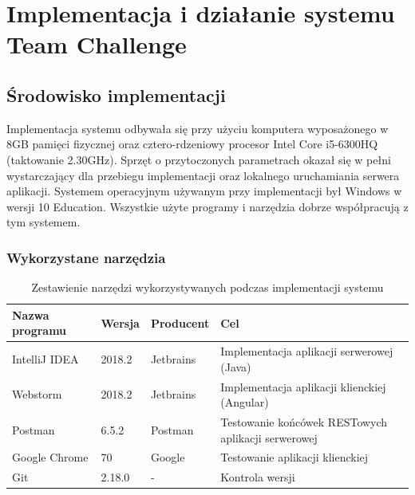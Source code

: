 \chapter{Implementacja i działanie systemu Team Challenge}

\section{Środowisko implementacji}

Implementacja systemu odbywała się przy użyciu komputera wyposażonego w 8GB pamięci fizycznej oraz cztero-rdzeniowy procesor Intel Core i5-6300HQ (taktowanie 2.30GHz). Sprzęt o przytoczonych parametrach okazał się w pełni wystarczający dla przebiegu implementacji oraz lokalnego uruchamiania serwera aplikacji. Systemem operacyjnym używanym przy implementacji był Windows w wersji 10 Education. Wszystkie użyte programy i narzędzia dobrze współpracują z tym systemem.

\subsection{Wykorzystane narzędzia}


\begin{table}[H]
\centering\small
\caption{Zestawienie narzędzi wykorzystywanych podczas implementacji systemu}
\label{tab:szablon}
\begin{tabularx}{\linewidth}{|p{.2\linewidth}|p{.1\linewidth}|p{.1\linewidth}|X|}\hline
Nazwa programu & Wersja & Producent & Cel\\ \hline\hline

IntelliJ IDEA & 2018.2 & Jetbrains & Implementacja aplikacji serwerowej (Java) \\ \hline

Webstorm & 2018.2 & Jetbrains & Implementacja aplikacji klienckiej (Angular) \\ \hline

Postman & 6.5.2 & Postman & Testowanie końcówek RESTowych aplikacji serwerowej \\ \hline

Google Chrome & 70 & Google & Testowanie aplikacji klienckiej \\ \hline

Git & 2.18.0 & - & Kontrola wersji \\ \hline

\end{tabularx}
\end{table}

